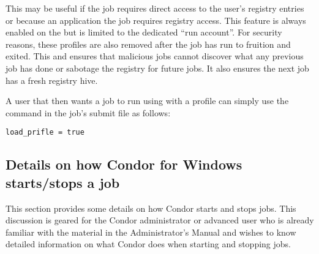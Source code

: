 This may be useful if the job requires direct access to the user's registry 
entries or because an application the job requires registry access. This 
feature is always enabled on the  but is limited to the 
dedicated ``run account''.  For security reasons, these profiles are also 
removed after the job has run to fruition and exited.  This and ensures 
that malicious jobs cannot discover what any previous job has done or 
sabotage the registry for future jobs. It also ensures the next job has 
a fresh registry hive.

A user that then wants a job to run using with a profile can simply
use the  command in the job's submit file as
follows:
\begin{verbatim}
load_prifle = true
\end{verbatim}


\subsection{Details on how Condor for Windows starts/stops a job}

This section provides some details on how Condor starts and stops jobs.
This discussion is geared for the Condor administrator or advanced user who is
already familiar with the material in the Administrator's Manual
and wishes to know detailed information on what Condor does when
starting and stopping jobs.

